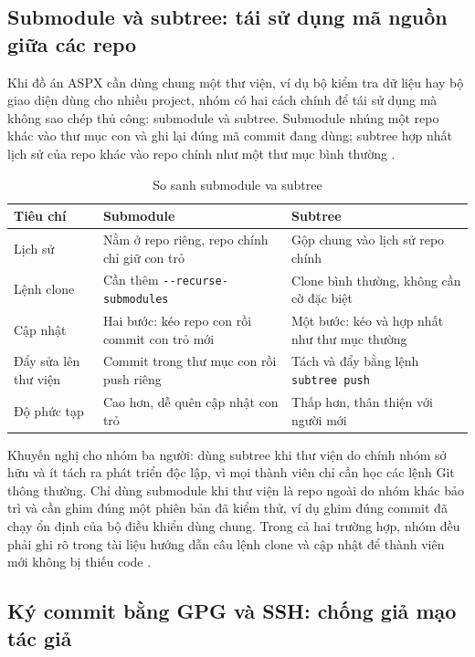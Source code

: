 \subsection{Submodule và subtree: tái sử dụng mã nguồn giữa các repo}

Khi đồ án ASPX cần dùng chung một thư viện, ví dụ bộ kiểm tra dữ liệu hay bộ giao diện dùng cho nhiều project, nhóm có hai cách chính để tái sử dụng mà không sao chép thủ công: submodule và subtree. Submodule nhúng một repo khác vào thư mục con và ghi lại đúng mã commit đang dùng; subtree hợp nhất lịch sử của repo khác vào repo chính như một thư mục bình thường \cite{progit}.

\begin{table}[H]
\centering
\caption{So sanh submodule va subtree}
\label{tab:c33-submodule}
\begin{tabular}{lll}
\toprule
Tiêu chí & Submodule & Subtree \\
\midrule
Lịch sử & Nằm ở repo riêng, repo chính chỉ giữ con trỏ & Gộp chung vào lịch sử repo chính \\
Lệnh clone & Cần thêm \verb|--recurse-submodules| & Clone bình thường, không cần cờ đặc biệt \\
Cập nhật & Hai bước: kéo repo con rồi commit con trỏ mới & Một bước: kéo và hợp nhất như thư mục thường \\
Đẩy sửa lên thư viện & Commit trong thư mục con rồi push riêng & Tách và đẩy bằng lệnh \verb|subtree push| \\
Độ phức tạp & Cao hơn, dễ quên cập nhật con trỏ & Thấp hơn, thân thiện với người mới \\
\bottomrule
\end{tabular}
\end{table}

Khuyến nghị cho nhóm ba người: dùng subtree khi thư viện do chính nhóm sở hữu và ít tách ra phát triển độc lập, vì mọi thành viên chỉ cần học các lệnh Git thông thường. Chỉ dùng submodule khi thư viện là repo ngoài do nhóm khác bảo trì và cần ghim đúng một phiên bản đã kiểm thử, ví dụ ghim đúng commit đã chạy ổn định của bộ điều khiển dùng chung. Trong cả hai trường hợp, nhóm đều phải ghi rõ trong tài liệu hướng dẫn câu lệnh clone và cập nhật để thành viên mới không bị thiếu code \cite{atlassiangit}.

\subsection{Ký commit bằng GPG và SSH: chống giả mạo tác giả}

